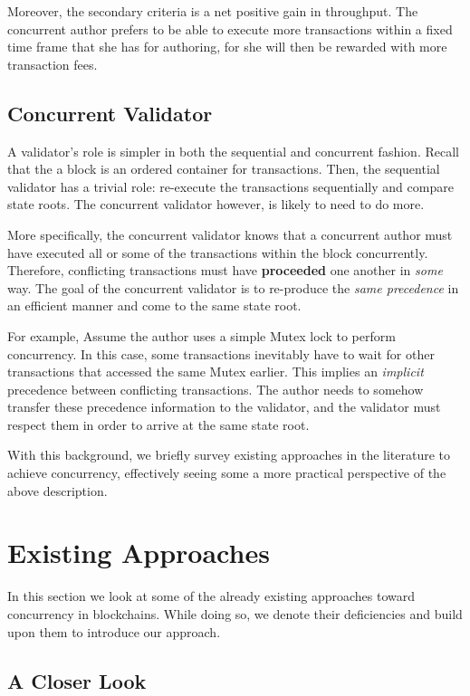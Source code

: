 Moreover, the secondary criteria is a net positive gain in throughput. The concurrent author prefers
to be able to execute more transactions within a fixed time frame that she has for authoring, for
she will then be rewarded with more transaction fees.

\subsection{Concurrent Validator}

A validator's role is simpler in both the sequential and concurrent fashion. Recall that the a block
is an ordered container for transactions. Then, the sequential validator has a trivial role:
re-execute the transactions sequentially and compare state roots. The concurrent validator however,
is likely to need to do more.

More specifically, the concurrent validator knows that a concurrent author must have executed all or
some of the transactions within the block concurrently. Therefore, conflicting transactions must
have \textbf{proceeded} one another in \textit{some} way. The goal of the concurrent validator is to
re-produce the \textit{same precedence} in an efficient manner and come to the same state root.

For example, Assume the author uses a simple Mutex lock to perform concurrency. In this case, some
transactions inevitably have to wait for other transactions that accessed the same Mutex
earlier. This implies an \textit{implicit} precedence between conflicting transactions. The author
needs to somehow transfer these precedence information to the validator, and the validator must
respect them in order to arrive at the same state root.

With this background, we briefly survey existing approaches in the literature to achieve
concurrency, effectively seeing some a more practical perspective of the above description.

\section{Existing Approaches}

In this section we look at some of the already existing approaches toward concurrency in
blockchains. While doing so, we denote their deficiencies and build upon them to introduce our
approach.

\subsection{A Closer Look}

